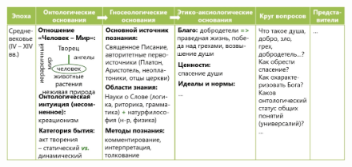 
\begin{figure}[H]
    \centering
    \includegraphics[width=0.8\linewidth]{pictures/med.png}
    \label{medieval}
\end{figure}






